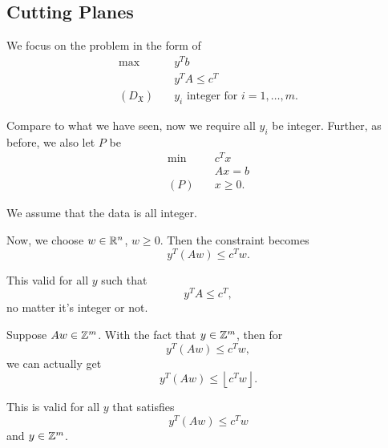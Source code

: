 \subsection{Cutting Planes}
\begin{prev}
	We focus on the problem in the form of
	\begin{align*}
		\max~                    & y^{T}b                                      \\
		                         & y^{T}A\leq c^{T}                            \\
		(D_{\mathfrak{X} })\quad & y_{i}\text{ integer for }i = 1, \ldots , m.
	\end{align*}
	\begin{note}
		Compare to what we have seen, now we require all \(y_{i}\) be integer. Further, as before, we also let \(P\) be
		\begin{align*}
			\min~    & c^Tx     \\
			         & Ax = b   \\
			(P)\quad & x\geq 0.
		\end{align*}
	\end{note}
\end{prev}
\begin{remark}
	We assume that the data is all integer.
\end{remark}

Now, we choose \(w\in \mathbb{\MakeUppercase{R}}^n\), \(w\geq 0\). Then the constraint becomes
\[
	y^{T}(Aw) \leq c^{T}w.
\]
\begin{remark}
	This valid for all \(y\) such that
	\[
		y^{T}A\leq c^{T},
	\]
	no matter it's integer or not.
\end{remark}

Suppose \(Aw\in\mathbb{\MakeUppercase{Z}}^m\). With the fact that \(y\in \mathbb{\MakeUppercase{Z}}^m\), then for
\[
	y^{T}(Aw)\leq c^{T}w,
\]
we can actually get
\[
	y^{T}(Aw)\leq \left\lfloor c^{T}w \right\rfloor.
\]
\begin{remark}
	This is valid for all \(y\) that satisfies
	\[
		y^{T}(Aw)\leq c^{T}w
	\]
	and \(y\in \mathbb{\MakeUppercase{Z}}^m\).
\end{remark}
\begin{figure}[H]
	\centering
	\label{fig:Cutting-planes-tighter-bound}
\end{figure}

